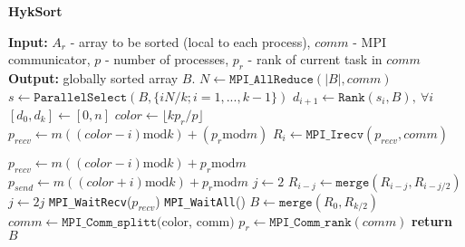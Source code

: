 \begin{algorithm}
    \caption{\textbf{HykSort}}
    \begin{algorithmic}
        \STATE \textbf{Input:} $A_r$ - array to be sorted (local to each process), $comm$ - MPI communicator, $p$ - number of processes, $p_r$ - rank of current task in $comm$
        \STATE \textbf{Output:} globally sorted array $B$.
            \STATE $N \gets \texttt{MPI\_AllReduce}(|B|, comm)$
            \STATE $s \gets \texttt{ParallelSelect}(B, \{i N/k ; i=1,...,k-1 \})$
            \STATE $d_{i+1} \gets \texttt{Rank}(s_i, B), \> \forall i$
            \STATE $[d_0, d_k] \gets [0, n]$
            \STATE $color \gets \lfloor k p_r/p \rfloor$
                \STATE $p_{recv} \gets m((color-i)\text{mod}k)+(p_r \text{mod}m)$
                \STATE $R_i \gets \texttt{MPI\_Irecv}(p_{recv}, comm)$
            \ENDPARFOR

                \STATE $p_{recv} \gets m((color-i)\text{mod}k)+p_r \text{mod}m$
                \STATE $p_{send} \gets m((color+i)\text{mod}k)+p_r \text{mod}m$
                \STATE $j \gets 2$
                    \STATE $R_{i-j} \gets \texttt{merge}(R_{i-j}, R_{i-j/2})$
                    \STATE $j \gets 2j$
                \ENDWHILE
                \STATE \texttt{MPI\_WaitRecv}($p_{recv}$)
            \ENDFOR
            \STATE \texttt{MPI\_WaitAll}()
            \STATE $B \gets \texttt{merge}(R_0, R_{k/2})$
            \STATE $comm \gets \texttt{MPI\_Comm\_splitt}($color, comm$)$
            \STATE $p_r \gets \texttt{MPI\_Comm\_rank}(comm)$
        \ENDWHILE
        \STATE \textbf{return } $B$
    \end{algorithmic}
\end{algorithm}